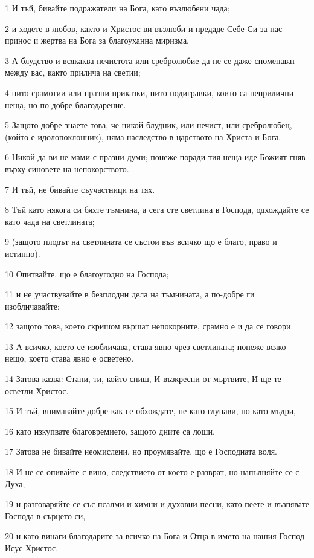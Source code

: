 \par 1 И тъй, бивайте подражатели на Бога, като възлюбени чада;
\par 2 и ходете в любов, както и Христос ви възлюби и предаде Себе Си за нас принос и жертва на Бога за благоуханна миризма.
\par 3 А блудство и всякаква нечистота или сребролюбие да не се даже споменават между вас, както прилича на светии;
\par 4 нито срамотии или празни приказки, нито подигравки, които са неприлични неща, но по-добре благодарение.
\par 5 Защото добре знаете това, че никой блудник, или нечист, или сребролюбец, (който е идолопоклонник), няма наследство в царството на Христа и Бога.
\par 6 Никой да ви не мами с празни думи; понеже поради тия неща иде Божият гняв върху синовете на непокорството.
\par 7 И тъй, не бивайте съучастници на тях.
\par 8 Тъй като някога си бяхте тъмнина, а сега сте светлина в Господа, одхождайте се като чада на светлината;
\par 9 (защото плодът на светлината се състои във всичко що е благо, право и истинно).
\par 10 Опитвайте, що е благоугодно на Господа;
\par 11 и не участвувайте в безплодни дела на тъмнината, а по-добре ги изобличавайте;
\par 12 защото това, което скришом вършат непокорните, срамно е и да се говори.
\par 13 А всичко, което се изобличава, става явно чрез светлината; понеже всяко нещо, което става явно е осветено.
\par 14 Затова казва: Стани, ти, който спиш, И възкресни от мъртвите, И ще те осветли Христос.
\par 15 И тъй, внимавайте добре как се обхождате, не като глупави, но като мъдри,
\par 16 като изкупвате благовремието, защото дните са лоши.
\par 17 Затова не бивайте неомислени, но проумявайте, що е Господната воля.
\par 18 И не се опивайте с вино, следствието от което е разврат, но напълняйте се с Духа;
\par 19 и разговаряйте се със псалми и химни и духовни песни, като пеете и възпявате Господа в сърцето си,
\par 20 и като винаги благодарите за всичко на Бога и Отца в името на нашия Господ Исус Христос,
